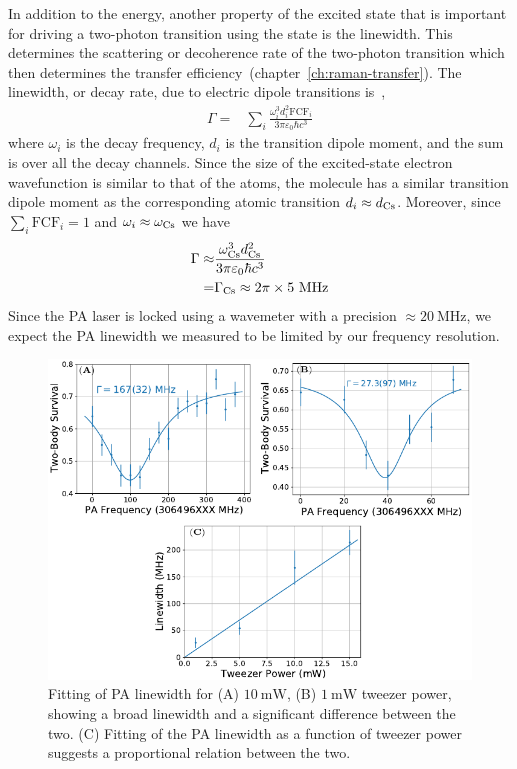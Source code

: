 In addition to the energy, another property of the excited state
that is important for driving a two-photon transition using the state is the linewidth.
This determines the scattering or decoherence rate of
the two-photon transition which then determines
the transfer efficiency~(chapter~\ref{ch:raman-transfer}).
The linewidth, or decay rate, due to electric dipole transitions
is~\cite[p.~197]{bransden_physics_2003},
\begin{align*}
  \Gamma=&\sum_{i}\frac{\omega_i^3d_i^2\mathrm{FCF}_i}{3\pi\varepsilon_0\hbar c^3}
\end{align*}
where $\omega_i$ is the decay frequency, $d_i$ is the transition dipole moment,
and the sum is over all the decay channels.
Since the size of the excited-state electron wavefunction is similar to that of the atoms,
the molecule has a similar transition dipole moment as the corresponding atomic transition
$d_i\approx d_{\mathrm{Cs}}$. Moreover, since $\sum_i\mathrm{FCF}_i=1$ and $\omega_i\approx\omega_{\mathrm{Cs}}$
we have
\begin{align*}
  \Gamma\approx&\frac{\omega_{\mathrm{Cs}}^3d_{\mathrm{Cs}}^2}{3\pi\varepsilon_0\hbar c^3}\\
  =&\Gamma_{\mathrm{Cs}}\approx2\pi\times5~\mathrm{MHz}
\end{align*}
Since the PA laser is locked using a wavemeter with a precision
$\approx\!20~\mathrm{MHz}$, we expect the PA linewidth we measured to be limited
by our frequency resolution.

\begin{figure}
  \centering
  \includegraphics[width=\textwidth]{figures/pa_linewidth_red_twr.pdf}
  \caption[PA linewidth for red detuned tweezer]{
    Fitting of PA linewidth for (A) $10~\mathrm{mW}$, (B) $1~\mathrm{mW}$ tweezer power,
    showing a broad linewidth and a significant difference between the two.
    (C) Fitting of the PA linewidth as a function of tweezer power suggests
    a proportional relation between the two.
    \label{fig:pa:linewidth:red-twr}}
\end{figure}

